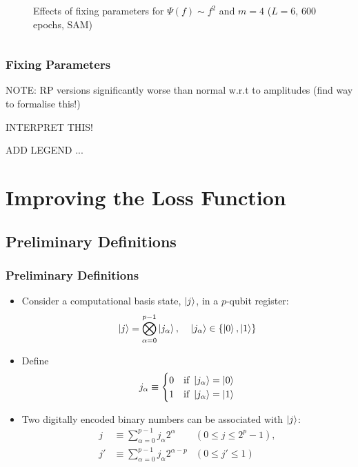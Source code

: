 \documentclass{beamer}
\begin{document}
\begin{frame}
\begin{columns}
\begin{column}{0.5\textwidth}
\begin{figure}
\caption{Effects of fixing parameters for $\Psi(f) \sim f^2$ and $m=4$ ($L=6$, 600 epochs, SAM)}
\end{figure}
\end{column}
\end{columns}
\end{frame}

\begin{frame}
\frametitle{Fixing Parameters}
NOTE: RP versions significantly worse than normal w.r.t to amplitudes (find way to formalise this!)

INTERPRET THIS! 

ADD LEGEND ...
\end{frame}

\section{Improving the Loss Function}

\subsection{Preliminary Definitions}

\begin{frame}
\frametitle{Preliminary Definitions}
\begin{itemize}
\item Consider a \alert{computational basis state}, $\ket{j}$, in a $p$-qubit register:
\begin{equation}
\ket{j} = \bigotimes^{p-1}_{\alpha=0} \ket{j_\alpha}, \; \; \; \; \ket{j_\alpha} \in \{\ket{0},\ket{1} \}
\end{equation}
\item Define 
\begin{equation}
j_\alpha \equiv \begin{cases}
0 & \text{if } \ket{j_\alpha}=\ket{0} \\
1 & \text{if }  \ket{j_\alpha}=\ket{1} \\
\end{cases}
\end{equation}
\item Two \alert{digitally encoded binary numbers} can be associated with $\ket{j}$:
\begin{align}
j &\equiv \sum_{\alpha=0}^{p-1} j_\alpha 2^{\alpha} &(0 \leq j \leq 2^p-1 ), \\
j' &\equiv \sum_{\alpha=0}^{p-1} j_\alpha 2^{\alpha-p} &(0 \leq j' \leq 1)
\end{align}
\end{itemize}
\end{frame}
\end{document}
